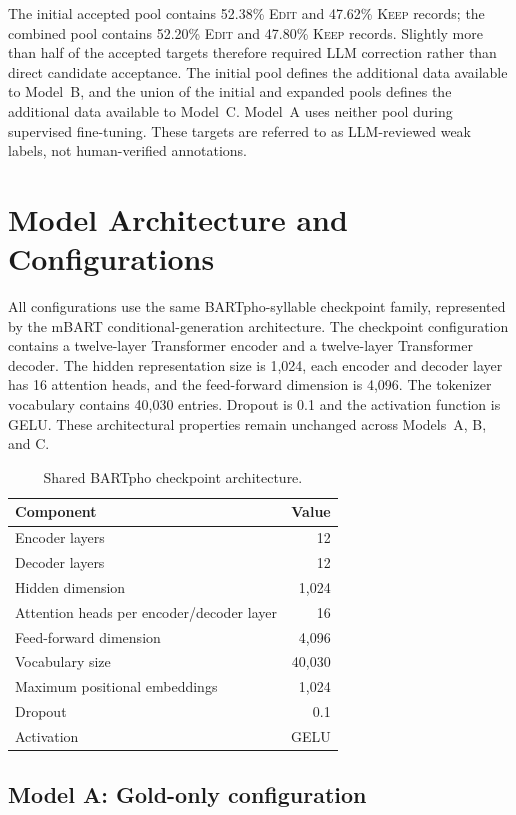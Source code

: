 \documentclass[11pt]{article}
\begin{document}
The initial accepted pool contains 52.38\% \textsc{Edit} and 47.62\% \textsc{Keep} records; the combined pool contains 52.20\% \textsc{Edit} and 47.80\% \textsc{Keep} records. Slightly more than half of the accepted targets therefore required LLM correction rather than direct candidate acceptance. The initial pool defines the additional data available to Model~B, and the union of the initial and expanded pools defines the additional data available to Model~C. Model~A uses neither pool during supervised fine-tuning. These targets are referred to as LLM-reviewed weak labels, not human-verified annotations.

\section{Model Architecture and Configurations}

All configurations use the same BARTpho-syllable checkpoint family, represented by the mBART conditional-generation architecture. The checkpoint configuration contains a twelve-layer Transformer encoder and a twelve-layer Transformer decoder. The hidden representation size is 1,024, each encoder and decoder layer has 16 attention heads, and the feed-forward dimension is 4,096. The tokenizer vocabulary contains 40,030 entries. Dropout is 0.1 and the activation function is GELU. These architectural properties remain unchanged across Models~A, B, and C.

\begin{table}[t]
\centering
\caption{Shared BARTpho checkpoint architecture.}
\label{tab:architecture}
\begin{tabular}{lr}
\toprule
Component & Value \\
\midrule
Encoder layers & 12 \\
Decoder layers & 12 \\
Hidden dimension & 1,024 \\
Attention heads per encoder/decoder layer & 16 \\
Feed-forward dimension & 4,096 \\
Vocabulary size & 40,030 \\
Maximum positional embeddings & 1,024 \\
Dropout & 0.1 \\
Activation & GELU \\
\bottomrule
\end{tabular}
\end{table}

\subsection{Model A: Gold-only configuration}
\end{document}
